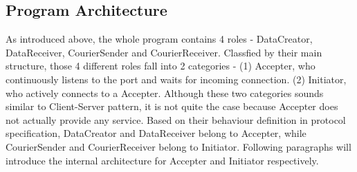 \subsection{Program Architecture}
As introduced above, the whole program contains 4 roles - DataCreator, DataReceiver, CourierSender and CourierReceiver. Classfied by their main structure, those 4 different roles fall into 2 categories - (1) Accepter, who continuously listens to the port and waits for incoming connection. (2) Initiator, who actively connects to a Accepter. Although these two categories sounds similar to Client-Server pattern, it is not quite the case because Accepter does not actually provide any service. Based on their behaviour definition in protocol specification, DataCreator and DataReceiver belong to Accepter, while CourierSender and CourierReceiver belong to Initiator. Following paragraphs will introduce the internal architecture for Accepter and Initiator respectively.
